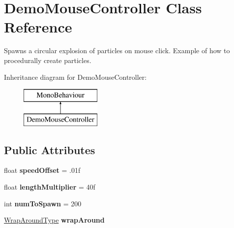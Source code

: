 \hypertarget{class_demo_mouse_controller}{}\section{Demo\+Mouse\+Controller Class Reference}
\label{class_demo_mouse_controller}


Spawns a circular explosion of particles on mouse click. Example of how to procedurally create particles.  


Inheritance diagram for Demo\+Mouse\+Controller\+:\begin{figure}[H]
\begin{center}
\leavevmode
\includegraphics[height=2.000000cm]{class_demo_mouse_controller}
\end{center}
\end{figure}
\subsection*{Public Attributes}
\begin{DoxyCompactItemize}
\item 
\hypertarget{class_demo_mouse_controller_a1597c655ed4460c48dd430b89b36f3cc}{}float {\bfseries speed\+Offset} = .\+01f\label{class_demo_mouse_controller_a1597c655ed4460c48dd430b89b36f3cc}

\item 
\hypertarget{class_demo_mouse_controller_adf0cb01f16b5d543067a2013a057e288}{}float {\bfseries length\+Multiplier} = 40f\label{class_demo_mouse_controller_adf0cb01f16b5d543067a2013a057e288}

\item 
\hypertarget{class_demo_mouse_controller_aa1a4bf8c5555d83629b6c9bfe22fe578}{}int {\bfseries num\+To\+Spawn} = 200\label{class_demo_mouse_controller_aa1a4bf8c5555d83629b6c9bfe22fe578}

\item 
\hypertarget{class_demo_mouse_controller_ad1f203719d0f8be7eff222da2a8596ed}{}\hyperlink{namespace_p_e2_d_a510b407ed8d0de3476df258ab95e1e50}{Wrap\+Around\+Type} {\bfseries wrap\+Around}\label{class_demo_mouse_controller_ad1f203719d0f8be7eff222da2a8596ed}

\end{DoxyCompactItemize}


